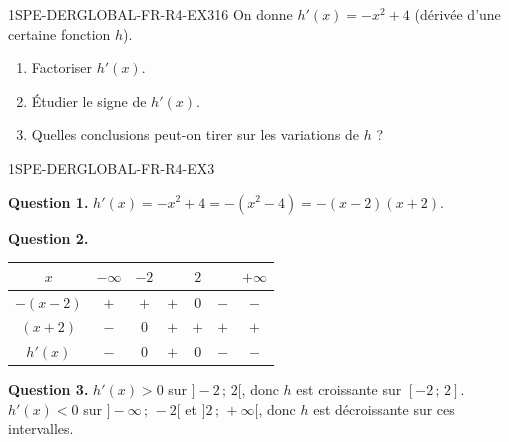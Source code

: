 
\begin{exercice}{1SPE-DERGLOBAL-FR-R4-EX3}{1}{6}
On donne $h'(x) = -x^2 + 4$ (dérivée d'une certaine fonction $h$).
\begin{enumerate}
  \item Factoriser $h'(x)$.
  \item Étudier le signe de $h'(x)$.
  \item Quelles conclusions peut-on tirer sur les variations de $h$ ?
\end{enumerate}
\end{exercice}


\begin{corrige}{1SPE-DERGLOBAL-FR-R4-EX3}

\textbf{Question 1.}
$h'(x) = -x^2 + 4 = -(x^2 - 4) = -(x-2)(x+2).$

\textbf{Question 2.}
\begin{center}
\begin{tabular}{|c|cccccc|}
\hline
$x$ & $-\infty$ & $-2$ & & $2$ & & $+\infty$ \\
\hline
$-(x-2)$ & $+$ & $+$ & $+$ & $0$ & $-$ & $-$ \\
$(x+2)$ & $-$ & $0$ & $+$ & $+$ & $+$ & $+$ \\
$h'(x)$ & $-$ & $0$ & $+$ & $0$ & $-$ & $-$ \\
\hline
\end{tabular}
\end{center}

\textbf{Question 3.}
$h'(x) > 0$ sur $]-2\,;\,2[$, donc $h$ est croissante sur $[-2\,;\,2]$.
$h'(x) < 0$ sur $]-\infty\,;\,-2[$ et $]2\,;\,+\infty[$, donc $h$ est décroissante sur ces intervalles.

\end{corrige}
